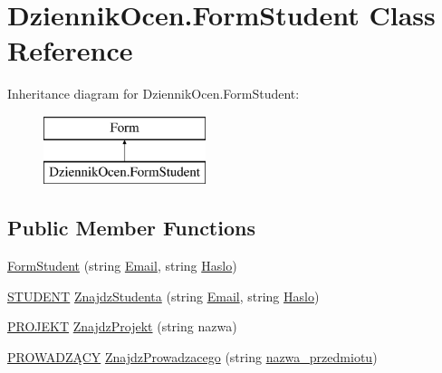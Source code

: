 \hypertarget{class_dziennik_ocen_1_1_form_student}{}\section{Dziennik\+Ocen.\+Form\+Student Class Reference}
\label{class_dziennik_ocen_1_1_form_student}
Inheritance diagram for Dziennik\+Ocen.\+Form\+Student\+:\begin{figure}[H]
\begin{center}
\leavevmode
\includegraphics[height=2.000000cm]{class_dziennik_ocen_1_1_form_student}
\end{center}
\end{figure}
\subsection*{Public Member Functions}
\begin{DoxyCompactItemize}
\item 
\hyperlink{class_dziennik_ocen_1_1_form_student_a180a91bbe1f167c994a1ac4c6464c495}{Form\+Student} (string \hyperlink{class_dziennik_ocen_1_1_form_student_a99d078499cfc9792c35a2e24bc379eaa}{Email}, string \hyperlink{class_dziennik_ocen_1_1_form_student_a605a1d835840f2800e5f86171d6dbe07}{Haslo})
\item 
\hyperlink{class_dziennik_ocen_1_1_s_t_u_d_e_n_t}{S\+T\+U\+D\+E\+NT} \hyperlink{class_dziennik_ocen_1_1_form_student_a2e4d1c0eee057f3843c967d3d3cb0be4}{Znajdz\+Studenta} (string \hyperlink{class_dziennik_ocen_1_1_form_student_a99d078499cfc9792c35a2e24bc379eaa}{Email}, string \hyperlink{class_dziennik_ocen_1_1_form_student_a605a1d835840f2800e5f86171d6dbe07}{Haslo})
\item 
\hyperlink{class_dziennik_ocen_1_1_p_r_o_j_e_k_t}{P\+R\+O\+J\+E\+KT} \hyperlink{class_dziennik_ocen_1_1_form_student_a14d788ebef23a75272beea8760885a0a}{Znajdz\+Projekt} (string nazwa)
\item 
\hyperlink{class_dziennik_ocen_1_1_p_r_o_w_a_d_z_xC4_x84_c_y}{P\+R\+O\+W\+A\+D\+ZĄ\+CY} \hyperlink{class_dziennik_ocen_1_1_form_student_ab07c634bad05aec5c88b1eb7a221dd88}{Znajdz\+Prowadzacego} (string \hyperlink{class_dziennik_ocen_1_1_form_student_a9809e038a5e376197dd5fbb861fd0740}{nazwa\+\_\+przedmiotu})
\end{DoxyCompactItemize}
